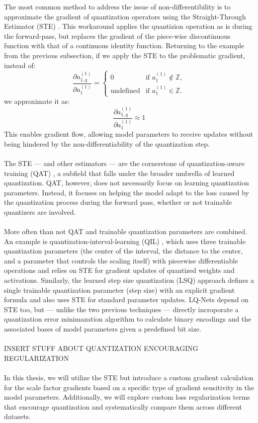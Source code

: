 The most common method to address the issue of non-differentibility is to approximate the gradient of quantization operators
using the Straight-Through Estimator (STE) \cite{bengio2013estimating} \cite{fan2021training}. This workaround applies the quantizion operation as is 
during the forward-pass, but replaces the gradient of the piece-wise discontinuous function 
with that of a continuous identity function. Returning to the example from the previous subsection,
if we apply the STE to the problematic gradient, instead of:
\[
  \frac{\partial a_{1,q}^{(1)}}{\partial a_{1}^{(1)}} =
  \begin{cases} 
      0 & \text{if } a_{1}^{(1)} \notin \mathbb{Z}, \\
      \text{undefined} & \text{if } a_{1}^{(1)} \in \mathbb{Z}.
  \end{cases}
  \]
we approximate it as: 
\[
  \frac{\partial a_{1,q}^{(1)}}{\partial a_{1}^{(1)}}  \approx 1
  \]
This enables gradient flow, allowing model parameters to receive updates
without being hindered by the non-differentiability of the quantization step.
\\
\\
The STE — and other estimators \cite{DBLP:journals/jstsp/Chen0ZHY20} —  are the cornerstone of quantization-aware training (QAT) \cite{jacob2018quantization},
a subfield that falls under the broader umbrella of learned quantization.
QAT, however, does not necessarily focus on learning quantization parameters.
Instead, it focuses on helping the model adapt to the loss caused by the quantization process during the forward pass,
whether or not trainable quantizers are involved.
\\
\\
More often than not QAT and trainable quantization parameters are combined. 
An example is quantization-interval-learning (QIL) \cite{DBLP:conf/cvpr/JungSLSHKHC19}, 
which uses three trainable quantization parameters 
(the center of the interval, the distance to the center, and a parameter that controls the scaling itself) 
with piecewise differentiable operations and relies on STE for gradient updates of quantized weights and activations. 
Similarly, the learned step size quantization (LSQ) approach \cite{DBLP:conf/iclr/EsserMBAM20} 
defines a single trainable quantization parameter (step size) with an explicit gradient formula and also uses STE for standard parameter updates.
LQ-Nets \cite{DBLP:conf/eccv/ZhangYYH18} depend on STE too, but  —  unlike the two previous techniques — 
directly incroporate a quantization error minimazation algorithm to calculate binary encodings and the associated bases of
model parameters given a predefined bit size. 
\\
\\
INSERT STUFF ABOUT QUANTIZATION ENCOURAGING REGULARIZATION
\\
\\
In this thesis, we will utilize the STE but introduce a custom gradient calculation for the scale factor gradients
based on a specific type of gradient sensitivity in the model parameters.
Additionally, we will explore custom loss regularization terms that encourage quantization
and systematically compare them across different datasets.